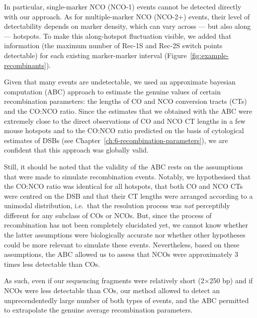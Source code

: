 In particular, single-marker NCO (NCO-1) events cannot be detected directly with our approach.
As for multiple-marker NCO (NCO-2+) events, their level of detectability depends on marker density, which can vary across — but also along — hotspots.
To make this along-hotspot fluctuation visible, we added that information (the maximum number of Rec-1S and Rec-2S switch points detectable) for each existing marker-marker interval (Figure~\ref{fig:example-recombinants}).\\

\begin{mccorrection}
Given that many events are undetectable, we used an approximate bayesian computation (ABC) approach to estimate the genuine values of certain recombination parameters: the lengths of CO and NCO conversion tracts (CTs) and the CO:NCO ratio.
Since the estimates that we obtained with the ABC were extremely close to the direct observations of CO and NCO CT lengths in a few mouse hotspots and to the CO:NCO ratio predicted on the basis of cytological estimates of DSBs (see Chapter~\ref{ch:6-recombination-parameters}), we are confident that this approach was globally valid.
\end{mccorrection}

Still, it should be noted that the validity of the ABC rests on the assumptions that were made to simulate recombination events. 
Notably, we hypothesised that the CO:NCO ratio was identical for all hotspots, that both CO and NCO CTs were centred on the DSB and that their CT lengths were arranged according to a unimodal distribution, i.e.\ that the resolution process was \textit{not} perceptibly different for any subclass of COs or NCOs.
But, since the process of recombination has not been completely elucidated yet, we cannot know whether the latter assumptions were biologically accurate nor whether other hypotheses could be more relevant to simulate these events.
Nevertheless, based on these assumptions, the ABC allowed us to assess that NCOs were approximately 3 times less detectable than COs.

As such, even if our sequencing fragments were relatively short (2$\times$250 bp) and if NCOs were less detectable than COs, our method allowed to detect an unprecendentedly large number of both types of events, and the ABC permitted to extrapolate the genuine average recombination parameters.\\

